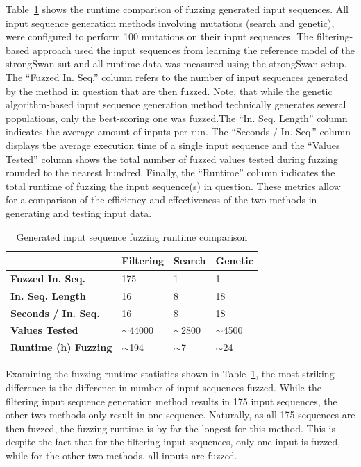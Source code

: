 Table~\ref{tab:compfuzz} shows the runtime comparison of fuzzing generated input sequences. All input sequence generation methods involving mutations (search and genetic), were configured to perform 100 mutations on their input sequences. The filtering-based approach used the input sequences from learning the reference model of the strongSwan \ac{sut} and all runtime data was measured using the strongSwan setup. The ``Fuzzed In. Seq.'' column refers to the number of input sequences generated by the method in question that are then fuzzed. Note, that while the genetic algorithm-based input sequence generation method technically generates several populations, only the best-scoring one was fuzzed.The ``In. Seq. Length'' column indicates the average amount of inputs per run. The ``Seconds / In. Seq.'' column displays the average execution time of a single input sequence and the ``Values Tested'' column shows the total number of fuzzed values tested during fuzzing rounded to the nearest hundred. Finally, the ``Runtime'' column indicates the total runtime of fuzzing the input sequence(s) in question. These metrics allow for a comparison of the efficiency and effectiveness of the two methods in generating and testing input data.


\begin{table}[h]
	\centering
	\begin{tabular}{|l|l|l|l|}
		\hline
		\rowcolor[HTML]{EFEFEF} 
		& \textbf{Filtering}					& \textbf{Search} 			& \textbf{Genetic}  \\ \hline
		\textbf{Fuzzed In. Seq.}            	& 175                 					& 1                			& 1					\\ \hline
		\textbf{In. Seq. Length}				& 16                					& 8               			& 18		  		\\ \hline
		\textbf{Seconds / In. Seq.}     		& 16                					& 8                			& 18				\\ \hline
		\textbf{Values Tested}     				& $\sim$44000              				& $\sim$2800		    	& $\sim$4500		\\ \hline
		\textbf{Runtime (h) Fuzzing}       		& $\sim$194          	 				& $\sim$7          			& $\sim$24			\\ \hline
	\end{tabular}
	\caption{Generated input sequence fuzzing runtime comparison}
	\label{tab:compfuzz}
\end{table}

Examining the fuzzing runtime statistics shown in Table~\ref{tab:compfuzz}, the most striking difference is the difference in number of input sequences fuzzed. While the filtering input sequence generation method results in 175 input sequences, the other two methods only result in one sequence. Naturally, as all 175 sequences are then fuzzed, the fuzzing runtime is by far the longest for this method. This is despite the fact that for the filtering input sequences, only one input is fuzzed, while for the other two methods, all inputs are fuzzed. 

